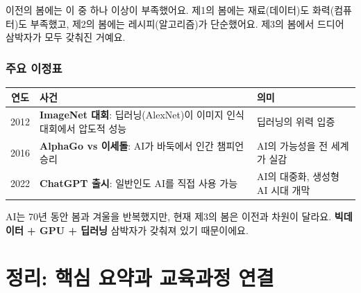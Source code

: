 \documentclass[11pt,a4paper]{article}
\begin{document}
이전의 봄에는 이 중 하나 이상이 부족했어요. 제1의 봄에는 재료(데이터)도 화력(컴퓨터)도 부족했고, 제2의 봄에는 레시피(알고리즘)가 단순했어요. 제3의 봄에서 드디어 삼박자가 모두 갖춰진 거예요.

\subsubsection{주요 이정표}

\begin{center}
\begin{tabular}{|c|p{5.5cm}|p{5.5cm}|}
\hline
\rowcolor{tableheader}
\textbf{연도} & \textbf{사건} & \textbf{의미} \\
\hline
2012 & \textbf{ImageNet 대회}: 딥러닝(AlexNet)이 이미지 인식 대회에서 압도적 성능 & 딥러닝의 위력 입증 \\
\hline
2016 & \textbf{AlphaGo vs 이세돌}: AI가 바둑에서 인간 챔피언 승리 & AI의 가능성을 전 세계가 실감 \\
\hline
2022 & \textbf{ChatGPT 출시}: 일반인도 AI를 직접 사용 가능 & AI의 대중화, 생성형 AI 시대 개막 \\
\hline
\end{tabular}
\end{center}

\begin{keybox}
AI는 70년 동안 봄과 겨울을 반복했지만, 현재 제3의 봄은 이전과 차원이 달라요. \textbf{빅데이터 + GPU + 딥러닝} 삼박자가 갖춰져 있기 때문이에요.
\end{keybox}



\section{ 정리: 핵심 요약과 교육과정 연결}
\end{document}
